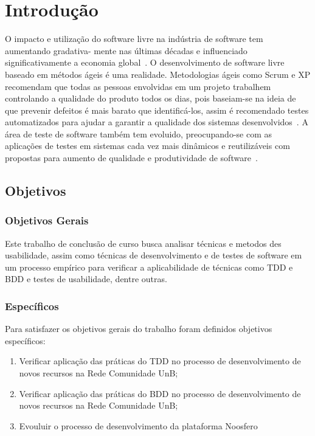 	\chapter{Introdução}

	O impacto e utilização do software livre na indústria de software tem aumentando gradativa-
	mente nas últimas décadas e influenciado significativamente a economia global~\cite{benkler2006}. 
	O desenvolvimento de software livre baseado em métodos ágeis é uma realidade. Metodologias ágeis 
	como Scrum e XP recomendam que todas as pessoas envolvidas em um projeto trabalhem controlando a 
	qualidade do produto todos os dias, pois baseiam-se na ideia de que prevenir defeitos é mais barato
	que identificá-los, assim é recomendado testes automatizados para ajudar a garantir a qualidade dos 
	sistemas desenvolvidos~\cite{bernardo2011}.
	A área de teste de software também tem evoluido, preocupando-se com as aplicações de testes
	em sistemas cada vez mais dinâmicos e reutilizáveis com propostas para aumento de qualidade
	e produtividade de software~\cite{vicente2010}.
	 
	\section{Objetivos}



	\subsection{Objetivos Gerais}
	 
	Este trabalho de conclusão de curso busca analisar técnicas e metodos des usabilidade, assim como técnicas de desenvolvimento e de testes de software em um processo empírico para verificar a aplicabilidade de técnicas como TDD e BDD e testes de usabilidade, dentre outras.
	
	 
	 
	\subsection{Específicos}

	 Para satisfazer os objetivos gerais do trabalho foram definidos objetivos específicos:

	\begin{enumerate}
	\item Verificar aplicação das práticas do TDD no processo de desenvolvimento de novos recursos na Rede Comunidade UnB;
	\item Verificar aplicação das práticas do BDD no processo de desenvolvimento de novos recursos na Rede Comunidade UnB;
	\item Evouluir o processo de desenvolvimento da plataforma Noosfero
	\end{enumerate}

